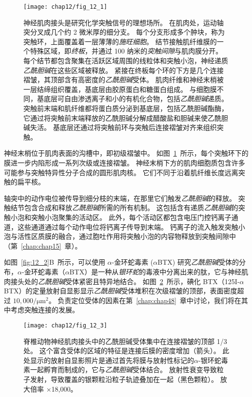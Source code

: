\begin{figure}[htbp]
	\centering
	\texttt{[image: chap12/fig\_12\_1]}
	\caption{神经肌肉接头是研究化学突触信号的理想场所。
		在肌肉处，运动轴突分叉成几个约 2 微米厚的细分支。
		每个分支形成多个肿块，称为突触环，上面覆盖着一层薄薄的\textit{施旺细胞}。
		结节接触肌纤维膜的一个特殊区域，即\textit{终板}，并通过 100 纳米的\textit{突触间隙}与肌肉膜分开。
		每个结节都包含聚集在活跃区域周围的线粒体和突触小泡，神经递质\textit{乙酰胆碱}在这些区域被释放。
		紧接在终板每个环的下方是几个连接褶皱，其顶部含有高密度的\textit{乙酰胆碱}受体。
		肌肉纤维和神经末梢被一层结缔组织覆盖，基底层由胶原蛋白和糖蛋白组成。
		与细胞膜不同，基底层可自由渗透离子和小的有机化合物，包括\textit{乙酰胆碱}递质。
		突触前末端和肌纤维都将蛋白质分泌到基底层，包括乙酰胆碱酯酶，它通过将突触前末端释放的乙酰胆碱分解成醋酸盐和胆碱来使乙酰胆碱失活。
		基底层还通过将突触前环与突触后连接褶皱对齐来组织突触\cite{mcmahan1971visual}。}
	\label{fig:12_1}
\end{figure}


神经末梢位于肌肉表面的沟槽中，即初级褶皱中。
如图~\ref{fig:12_1}~所示，每个突触环下的膜进一步内陷形成一系列次级或连接褶皱。
神经末梢下方的肌肉细胞质包含许多可能参与突触特异性分子合成的圆形肌肉核。
它们不同于沿着肌纤维长度远离突触的扁平核。


轴突中的动作电位被传导到细分枝的末端，在那里它们触发\textit{乙酰胆碱}的释放。
突触结节包含合成和释放\textit{乙酰胆碱}所需的所有机制。
这包括含有递质\textit{乙酰胆碱}的突触小泡和突触小泡聚集的活动区。
此外，每个活动区都包含电压门控钙离子通道，这些通道通过每个动作电位将钙离子传导到末端。
钙离子的流入触发突触小泡与活性区质膜的融合，通过胞吐作用将突触小泡的内容物释放到突触间隙中（第~\ref{chap:chap15}~章）。


如图~\ref{fig:12_2}B~所示，可以使用 $\alpha$-金环蛇毒素 ($\alpha$BTX) 研究\textit{乙酰胆碱}受体的分布，$\alpha$-金环蛇毒素（$\alpha$BTX）是一种从\textit{银环蛇}的毒液中分离出来的肽，它与神经肌肉接头处的\textit{乙酰胆碱}受体紧密且特异地结合。
如图~\ref{fig:12_3}~所示，碘化 BTX（125I-$\alpha$BTX）的定量放射自显影显示\textit{乙酰胆碱}受体堆积在次级褶皱的顶部，表面密度超过 $10,000/\mathrm{\mu m}^2$。
负责定位受体的因素在第~\ref{chap:chap48}~章中讨论，我们将在其中考虑突触连接的发展。


\begin{figure}[htbp]
	\centering
	\texttt{[image: chap12/fig\_12\_3]}
	\caption{脊椎动物神经肌肉接头中的乙酰胆碱受体集中在连接褶皱的顶部 1/3 处。
		这个富含受体的区域的特征是连接后膜的密度增加（箭头）。
		此处显示的放射自显影照片是通过首先将膜与放射性标记的$\alpha$-银环蛇毒素一起孵育而制成的，它与\textit{乙酰胆碱}受体结合。
		放射性衰变导致粒子发射，导致覆盖的银颗粒沿粒子轨迹叠加在一起（黑色颗粒）。
		放大倍率 ×18,000。}
	\label{fig:12_3}
\end{figure}



